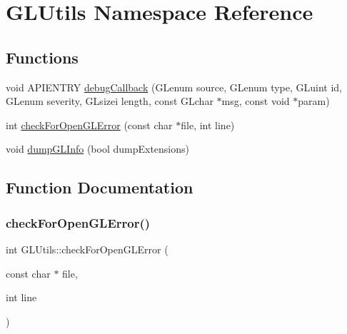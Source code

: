 \hypertarget{namespace_g_l_utils}{}\section{G\+L\+Utils Namespace Reference}
\label{namespace_g_l_utils}
\subsection*{Functions}
\begin{DoxyCompactItemize}
\item 
void A\+P\+I\+E\+N\+T\+RY \mbox{\hyperlink{namespace_g_l_utils_a8ef89ac7d74a0069f0fbd8916a640083}{debug\+Callback}} (G\+Lenum source, G\+Lenum type, G\+Luint id, G\+Lenum severity, G\+Lsizei length, const G\+Lchar $\ast$msg, const void $\ast$param)
\item 
int \mbox{\hyperlink{namespace_g_l_utils_ab06cd91516098512da450aeb4b1b80ab}{check\+For\+Open\+G\+L\+Error}} (const char $\ast$file, int line)
\item 
void \mbox{\hyperlink{namespace_g_l_utils_afbb44734b4804fdf35a4adb3b620ece5}{dump\+G\+L\+Info}} (bool dump\+Extensions)
\end{DoxyCompactItemize}


\subsection{Function Documentation}
\mbox{\label{namespace_g_l_utils_ab06cd91516098512da450aeb4b1b80ab}} 
\subsubsection{\texorpdfstring{checkForOpenGLError()}{checkForOpenGLError()}}
{\footnotesize\ttfamily int G\+L\+Utils\+::check\+For\+Open\+G\+L\+Error (\begin{DoxyParamCaption}\item[{const char $\ast$}]{file,  }\item[{int}]{line }\end{DoxyParamCaption})}

\mbox{\label{namespace_g_l_utils_a8ef89ac7d74a0069f0fbd8916a640083}} 
